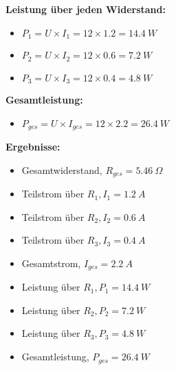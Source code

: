 \documentclass[12pt,a4paper]{scrartcl}
\newcommand{\tightlist}{
  \setlength{\itemsep}{0pt}\setlength{\parskip}{0pt}
}
\begin{document}
\textbf{Leistung über jeden Widerstand:}

\begin{itemize}
\tightlist
\item
  \(P_1 = U \times I_1 = 12 \times 1.2 = 14.4~W\)
\item
  \(P_2 = U \times I_2 = 12 \times 0.6 = 7.2~W\)
\item
  \(P_3 = U \times I_3 = 12 \times 0.4 = 4.8~W\)
\end{itemize}

\textbf{Gesamtleistung:}

\begin{itemize}
\tightlist
\item
  \(P_{ges} = U \times I_{ges} = 12 \times 2.2 = 26.4~W\)
\end{itemize}

\textbf{Ergebnisse:}

\begin{itemize}
\tightlist
\item
  Gesamtwiderstand, \(R_{ges} = 5.46~\Omega\)
\item
  Teilstrom über \(R_1, I_1 = 1.2~A\)
\item
  Teilstrom über \(R_2, I_2 = 0.6~A\)
\item
  Teilstrom über \(R_3, I_3 = 0.4~A\)
\item
  Gesamtstrom, \(I_{ges} = 2.2~A\)
\item
  Leistung über \(R_1, P_1 = 14.4~W\)
\item
  Leistung über \(R_2, P_2 = 7.2~W\)
\item
  Leistung über \(R_3, P_3 = 4.8~W\)
\item
  Gesamtleistung, \(P_{ges} = 26.4~W\)
\end{itemize} %
\end{document}
